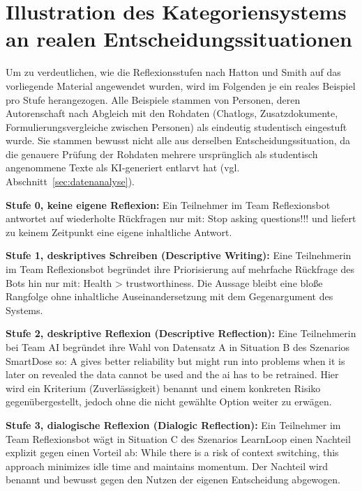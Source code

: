 \section{Illustration des Kategoriensystems an realen Entscheidungssituationen}
\label{sec:illustration-kategoriensystem}

Um zu verdeutlichen, wie die Reflexionsstufen nach Hatton und Smith
\cite{hattonSmithReflectionTeacherEducation1995} auf das vorliegende Material angewendet wurden, wird
im Folgenden je ein reales Beispiel pro Stufe herangezogen. Alle Beispiele stammen von Personen, deren
Autorenschaft nach Abgleich mit den Rohdaten (Chatlogs, Zusatzdokumente, Formulierungsvergleiche
zwischen Personen) als eindeutig studentisch eingestuft wurde. Sie stammen bewusst nicht alle aus
derselben Entscheidungssituation, da die genauere Prüfung der Rohdaten mehrere ursprünglich als
studentisch angenommene Texte als KI-generiert entlarvt hat (vgl. Abschnitt~\ref{sec:datenanalyse}).

\textbf{Stufe 0, keine eigene Reflexion:} Ein Teilnehmer im Team Reflexionsbot antwortet auf wiederholte
Rückfragen nur mit: \glqq Stop asking questions!!!\grqq{} und liefert zu keinem Zeitpunkt eine eigene
inhaltliche Antwort.

\textbf{Stufe 1, deskriptives Schreiben (Descriptive Writing):} Eine Teilnehmerin im Team Reflexionsbot begründet ihre Priorisierung
auf mehrfache Rückfrage des Bots hin nur mit: \glqq Health > trustworthiness\grqq{}. Die Aussage bleibt
eine bloße Rangfolge ohne inhaltliche Auseinandersetzung mit dem Gegenargument des Systems.

\textbf{Stufe 2, deskriptive Reflexion (Descriptive Reflection):} Eine Teilnehmerin bei Team AI begründet ihre Wahl von
Datensatz A in Situation B des Szenarios SmartDose so: \glqq A gives better reliability but might run
into problems when it is later on revealed the data cannot be used and the ai has to be
retrained\grqq{}. Hier wird ein Kriterium (Zuverlässigkeit) benannt und einem konkreten Risiko
gegenübergestellt, jedoch ohne die nicht gewählte Option weiter zu erwägen.

\textbf{Stufe 3, dialogische Reflexion (Dialogic Reflection):} Ein Teilnehmer im Team Reflexionsbot wägt in Situation C des
Szenarios LearnLoop einen Nachteil explizit gegen einen Vorteil ab: \glqq While there is a risk of
context switching, this approach minimizes idle time and maintains momentum.\grqq{} Der Nachteil wird
benannt und bewusst gegen den Nutzen der eigenen Entscheidung abgewogen.

